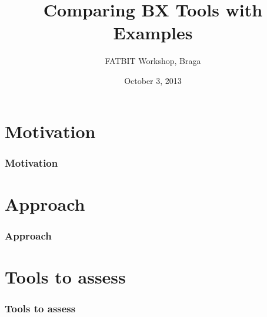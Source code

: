 \documentclass{beamer}
\title[Comparing BX Tools with Examples]{Comparing BX Tools with Examples\\ } %
\author{	
FATBIT Workshop, Braga
} %
\institute[DI.UM] %
{
HASLab, University of Minho \\ %
}
\date{October 3, 2013} %
\begin{document}
\begin{frame}
\titlepage %
\end{frame}









\section{Motivation}

\begin{frame}
\frametitle{Motivation}

\end{frame}



\section{Approach}
\begin{frame}
\frametitle{Approach}

\end{frame}


\section{Tools to assess}
\begin{frame}
\frametitle{Tools to assess}

\end{frame}
\end{document}
